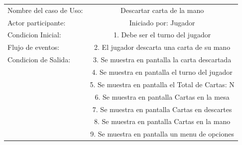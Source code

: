 \begin{center}
    \begin{tabular}{ l | c  }
        Nombre del caso de Uso: & Descartar carta de la mano                      \\
        Actor participante:     & Iniciado por: Jugador                           \\\hline
        Condicion Inicial:      & 1. Debe ser el turno del jugador                \\
        Flujo de eventos:       & 2. El jugador descarta una carta de su mano     \\\hline
        Condicion de Salida:    & 3. Se muestra en pantalla la carta descartada   \\
                                & 4. Se muestra en pantalla el turno del jugador  \\
                                & 5. Se muestra en pantalla el Total de Cartas: N \\
                                & 6. Se muestra en pantalla Cartas en la mesa     \\
                                & 7. Se muestra en pantalla Cartas en descartes   \\
                                & 8. Se muestra en pantalla Cartas en la mano     \\
                                & 9. Se muestra en pantalla un menu de opciones   \\ 
    \end{tabular} \\
\end{center}
